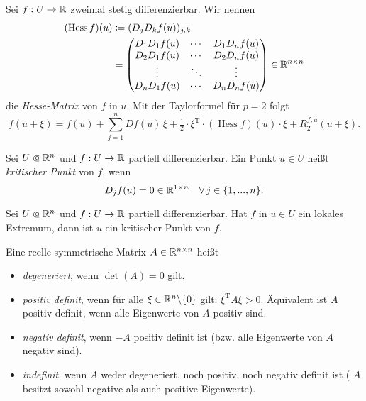 \documentclass{cheat-sheet}
\DeclareMathOperator{\Hess}{Hess} %
\begin{document}
\begin{bem}[Taylorformel für $p = 2$]
  Sei $f : U \to \mathbb{R}$ zweimal stetig differenzierbar. Wir nennen
  \begin{align*}
    (\Hess f)(u) &\coloneqq (D_j D_k f(u))_{j,k}\\
    &= \begin{pmatrix} D_1 D_1 f(u) & \cdots & D_1 D_n f(u) \\ D_2 D_1 f(u) & \cdots & D_2 D_n f(u) \\ \vdots & \ddots & \vdots \\ D_n D_1 f(u) & \cdots & D_n D_n f(u) \end{pmatrix} \in \R^{n \times n}
  \end{align*}
  die \emph{Hesse-Matrix} von $f$ in $u$. Mit der Taylorformel für $p = 2$ folgt
  \[ f(u + \xi) = f(u) + \sum_{j=1}^{n} D f(u)\,\xi + \tfrac{1}{2} \cdot \xi^{\text{T}} \cdot (\Hess f)(u) \cdot \xi + R_2^{f,u}(u + \xi). \]
\end{bem}

\begin{defn}
  Sei $U \opn \R^n$ und $f : U \to \mathbb{R}$ partiell differenzierbar. Ein Punkt $u \in U$ heißt \emph{kritischer Punkt} von $f$, wenn
  \[ D_j f(u) = 0 \in \mathbb{R}^{1 \times n}\quad \forall\,j \in \{ 1, ..., n \}. \]
\end{defn}

\begin{satz}
  Sei $U \opn \R^n$ und $f : U \to \mathbb{R}$ partiell differenzierbar. Hat $f$ in $u \in U$ ein lokales Extremum, dann ist $u$ ein kritischer Punkt von $f$.
\end{satz}

\begin{defn}
  Eine reelle symmetrische Matrix $A \in \mathbb{R}^{n \times n}$ heißt
  \begin{itemize}
    \item \emph{degeneriert}, wenn $\det(A) = 0$ gilt.
    \item \emph{positiv definit}, wenn für alle $\xi \in \mathbb{R}^n \backslash \{ 0 \}$ gilt: $\xi^{\text{T}}A\xi > 0.$ Äquivalent ist $A$ positiv definit, wenn alle Eigenwerte von $A$ positiv sind.
    \item \emph{negativ definit}, wenn $-A$ positiv definit ist (bzw. alle Eigenwerte von $A$ negativ sind).
    \item \emph{indefinit}, wenn $A$ weder degeneriert, noch positiv, noch negativ definit ist (\dh{} $A$ besitzt sowohl negative als auch positive Eigenwerte).
  \end{itemize}
\end{defn}
\end{document}
